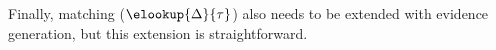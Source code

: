 Finally, matching ($\elookup{\env}{\type}$) also needs to be
extended with evidence generation, but this extension is
straightforward.






